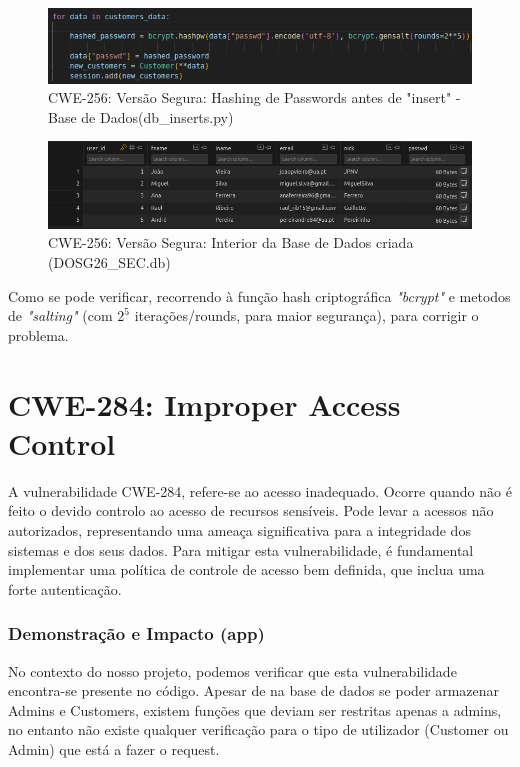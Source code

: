 \begin{figure}[H]
  \centering
  \includegraphics[width=16cm]{images/CWE-256-Hashing.png}
  \caption{CWE-256: Versão Segura: Hashing de Passwords antes de "insert" - Base de Dados(db\_inserts.py)}
  \label{fig:cwe256-hash}
\end{figure}

\begin{figure}[H]
  \centering
  \includegraphics[width=16cm]{images/CWE-256-BDs.png}
  \caption{CWE-256: Versão Segura: Interior da Base de Dados criada (DOSG26\_SEC.db)}
  \label{fig:cwe256-BDs}
\end{figure}

Como se pode verificar, recorrendo à função hash criptográfica \textit{"bcrypt"} e metodos de \textit{"salting"} (com $2^5$ iterações/rounds, para maior segurança), para corrigir o problema. 

%
%
\section{CWE-284: Improper Access Control}
\label{sec.cwe284}

A vulnerabilidade CWE-284, refere-se ao acesso inadequado. Ocorre quando não é feito o devido controlo ao acesso de recursos sensíveis. Pode levar a acessos não autorizados, representando uma ameaça significativa para a integridade dos sistemas e dos seus dados.
Para mitigar esta vulnerabilidade, é fundamental implementar uma política de controle de acesso bem definida, que inclua uma forte autenticação.

\subsubsection{Demonstração e Impacto (app)}

No contexto do nosso projeto, podemos verificar que esta vulnerabilidade encontra-se presente no código. Apesar de na base de dados se poder armazenar Admins e Customers, existem funções que deviam ser restritas apenas a admins, no entanto não existe qualquer verificação para o tipo de utilizador (Customer ou Admin) que está a fazer o request. 


